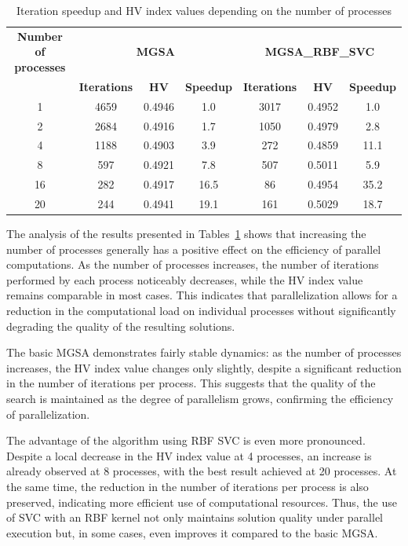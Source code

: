 \documentclass[a4paper]{llncs}
\begin{document}
\begin{table}[ht]
\centering
\caption{Iteration speedup and HV index values depending on the number of processes}
\label{tab:task2}
\begin{tabular}{ccccccc}
\hline
\textbf{Number of processes} & \multicolumn{3}{c}{\textbf{MGSA}} & \multicolumn{3}{c}{\textbf{MGSA\_RBF\_SVC}} \\
 & \textbf{Iterations} & \textbf{HV} & \textbf{Speedup}  & \textbf{Iterations} & \textbf{HV} & \textbf{Speedup}  \\
\hline
1 & 4659 & 0.4946 & 1.0   & 3017 & 0.4952 & 1.0   \\
2 & 2684 & 0.4916 & 1.7   & 1050 & 0.4979 & 2.8   \\
4 & 1188 & 0.4903 & 3.9   & 272  & 0.4859 & 11.1  \\
8 & 597  & 0.4921 & 7.8   & 507  & 0.5011 & 5.9   \\
16 & 282 & 0.4917 & 16.5  & 86   & 0.4954 & 35.2  \\
20 & 244 & 0.4941 & 19.1  & 161  & 0.5029 & 18.7  \\
\hline
\end{tabular}
\end{table}


The analysis of the results presented in Tables~\ref{tab:task2} shows that increasing the number of processes generally has a positive effect on the efficiency of parallel computations. As the number of processes increases, the number of iterations performed by each process noticeably decreases, while the HV index value remains comparable in most cases. This indicates that parallelization allows for a reduction in the computational load on individual processes without significantly degrading the quality of the resulting solutions.

The basic MGSA demonstrates fairly stable dynamics: as the number of processes increases, the HV index value changes only slightly, despite a significant reduction in the number of iterations per process. This suggests that the quality of the search is maintained as the degree of parallelism grows, confirming the efficiency of parallelization.

The advantage of the algorithm using RBF SVC is even more pronounced. Despite a local decrease in the HV index value at 4 processes, an increase is already observed at 8 processes, with the best result achieved at 20 processes. At the same time, the reduction in the number of iterations per process is also preserved, indicating more efficient use of computational resources. Thus, the use of SVC with an RBF kernel not only maintains solution quality under parallel execution but, in some cases, even improves it compared to the basic MGSA.
\end{document}
